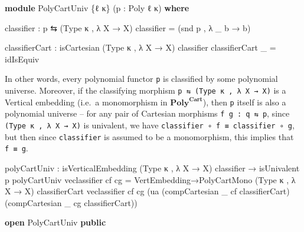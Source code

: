 \documentclass[
  11pt,
  oneside,
  article]{memoir}
\newenvironment{Shaded}{}{}
\newcommand{\KeywordTok}[1]{\textcolor[rgb]{0.00,0.44,0.13}{\textbf{#1}}}
\newcommand{\NormalTok}[1]{#1}
\newcommand{\OtherTok}[1]{\textcolor[rgb]{0.00,0.44,0.13}{#1}}
\theoremstyle{definition}
\theoremstyle{plain}
\newcommand{\Cat}[1]{\mathbf{#1}}%
\newcommand{\poly}{\Cat{Poly}}
\newcommand{\0}{\textsf{0}}
\newcommand{\1}{\tn{\textsf{1}}}
\begin{document}
\begin{Shaded}
\begin{Highlighting}[]
\KeywordTok{module}\NormalTok{ PolyCartUniv }\OtherTok{\{}\NormalTok{ℓ κ}\OtherTok{\}} \OtherTok{(}\NormalTok{p }\OtherTok{:}\NormalTok{ Poly ℓ κ}\OtherTok{)} \KeywordTok{where}

\NormalTok{    classifier }\OtherTok{:}\NormalTok{ p ⇆ }\OtherTok{(}\NormalTok{Type κ , }\OtherTok{λ}\NormalTok{ X }\OtherTok{→}\NormalTok{ X}\OtherTok{)}
\NormalTok{    classifier }\OtherTok{=} \OtherTok{(}\NormalTok{snd p , }\OtherTok{λ} \OtherTok{\_}\NormalTok{ b }\OtherTok{→}\NormalTok{ b}\OtherTok{)}

\NormalTok{    classifierCart }\OtherTok{:}\NormalTok{ isCartesian }\OtherTok{(}\NormalTok{Type κ , }\OtherTok{λ}\NormalTok{ X }\OtherTok{→}\NormalTok{ X}\OtherTok{)}\NormalTok{ classifier}
\NormalTok{    classifierCart }\OtherTok{\_} \OtherTok{=}\NormalTok{ idIsEquiv}
\end{Highlighting}
\end{Shaded}

In other words, every polynomial functor \texttt{p} is classified by
some polynomial universe. Moreover, if the classifying morphism
\texttt{p\ ⇆\ (Type\ κ\ ,\ λ\ X\ →\ X)} is a Vertical embedding (i.e.~a
monomorphism in \(\poly^{\mathbf{Cart}}\)), then \texttt{p}
itself is also a polynomial universe -- for any pair of Cartesian
morphisms \texttt{f\ g\ :\ q\ ⇆\ p}, since
\texttt{(Type\ κ\ ,\ λ\ X\ →\ X)} is univalent, we have
\texttt{classifier\ ∘\ f\ ≡\ classifier\ ∘\ g}, but then since
\texttt{classifier} is assumed to be a monomorphism, this implies that
\texttt{f\ ≡\ g}.

\begin{Shaded}
\begin{Highlighting}[]
\NormalTok{    polyCartUniv }\OtherTok{:}\NormalTok{ isVerticalEmbedding }\OtherTok{(}\NormalTok{Type κ , }\OtherTok{λ}\NormalTok{ X }\OtherTok{→}\NormalTok{ X}\OtherTok{)}\NormalTok{ classifier }\OtherTok{→}\NormalTok{ isUnivalent p}
\NormalTok{    polyCartUniv veclassifier cf cg }\OtherTok{=} 
\NormalTok{        VertEmbedding→PolyCartMono}
            \OtherTok{(}\NormalTok{Type κ , }\OtherTok{λ}\NormalTok{ X }\OtherTok{→}\NormalTok{ X}\OtherTok{)} 
\NormalTok{            classifierCart }
\NormalTok{            veclassifier}
\NormalTok{            cf cg }
            \OtherTok{(}\NormalTok{ua }\OtherTok{(}\NormalTok{compCartesian }\OtherTok{\_}\NormalTok{ cf classifierCart}\OtherTok{)} 
                \OtherTok{(}\NormalTok{compCartesian }\OtherTok{\_}\NormalTok{ cg classifierCart}\OtherTok{))}

\KeywordTok{open}\NormalTok{ PolyCartUniv }\KeywordTok{public}
\end{Highlighting}
\end{Shaded}
\end{document}
